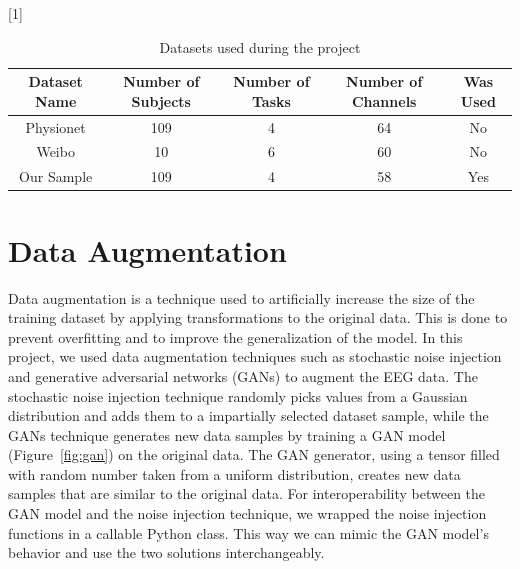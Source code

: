 \begin{table}[!htbp]
    \centering
    \scalebox{.8}[1]{
    \begin{tabular}{|c|c|c|c||c|}
        \hline
        \textbf{Dataset Name} & \textbf{Number of Subjects} & \textbf{Number of Tasks} & \textbf{Number of Channels} & \textbf{Was Used}\\
        \hline
        \hline
        Physionet & 109 & 4 & 64 & No\\
        \hline
        Weibo & 10 & 6 & 60 & No\\
        \hline
        Our Sample & 109 & 4 & 58 & Yes \\
        \hline
    \end{tabular}
    }
    \caption{Datasets used during the project}
    \label{tab:datasamples}
\end{table}


\section{Data Augmentation}
Data augmentation is a technique used to artificially increase the size of the training dataset by applying transformations to the original data.
This is done to prevent overfitting and to improve the generalization of the model.
In this project, we used data augmentation techniques such as stochastic noise injection and generative adversarial networks (GANs) to augment the EEG data.
The stochastic noise injection technique randomly picks values from a Gaussian distribution and adds them to a impartially selected dataset sample, while the GANs technique generates new data samples by training a GAN model (Figure~\ref{fig:gan}) on the original data.
The GAN generator, using a tensor filled with random number taken from a uniform distribution, creates new data samples that are similar to the original data.
For interoperability between the GAN model and the noise injection technique, we wrapped the noise injection functions in a callable Python class.
This way we can mimic the GAN model's behavior and use the two solutions interchangeably.


